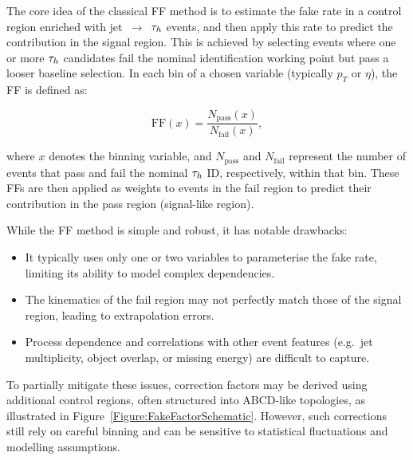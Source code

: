 The core idea of the classical FF method is to estimate the fake rate in a control region enriched with jet~$\to$~$\tau_h$ events, and then apply this rate to predict the contribution in the signal region. This is achieved by selecting events where one or more $\tau_h$ candidates fail the nominal identification working point but pass a looser baseline selection. In each bin of a chosen variable (typically $p_T$ or $\eta$), the FF is defined as:

\begin{equation}
    \text{FF}(x) = \frac{N_\text{pass}(x)}{N_\text{fail}(x)},
\end{equation}

where $x$ denotes the binning variable, and $N_\text{pass}$ and $N_\text{fail}$ represent the number of events that pass and fail the nominal $\tau_h$ ID, respectively, within that bin. These FFs are then applied as weights to events in the fail region to predict their contribution in the pass region (signal-like region).

While the FF method is simple and robust, it has notable drawbacks:

\begin{itemize}
    \item It typically uses only one or two variables to parameterise the fake rate, limiting its ability to model complex dependencies.
    \item The kinematics of the fail region may not perfectly match those of the signal region, leading to extrapolation errors.
    \item Process dependence and correlations with other event features (e.g.\ jet multiplicity, object overlap, or missing energy) are difficult to capture.
\end{itemize}

To partially mitigate these issues, correction factors may be derived using additional control regions, often structured into ABCD-like topologies, as illustrated in Figure~\ref{Figure:FakeFactorSchematic}. However, such corrections still rely on careful binning and can be sensitive to statistical fluctuations and modelling assumptions.


